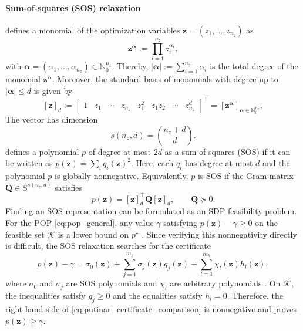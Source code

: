 \paragraph{Sum-of-squares (SOS) relaxation}
\cite{Yang2024Semidefinite} defines a monomial
of the optimization variables \(\bm{z}=(z_1,\ldots,z_{n_z})\) as
\begin{equation}
\bm{z}^{\bm{\alpha}}:=\prod_{i=1}^{n_z}z_i^{\alpha_i},
\label{eq:monomial_basis_comparison}
\end{equation}
with \(\bm{\alpha}=(\alpha_1,\ldots,\alpha_{n_z})\in\mathbb{N}_0^{n_z}\). Thereby, 
$|\bm{\alpha}|:=\sum_{i=1}^{n_z}\alpha_i$ is the total degree of the monomial $\bm{z}^{\bm{\alpha}}$. 
Moreover, the standard basis of monomials with
degree up to \( |\bm{\alpha}|\leq d\) is given by
\[
[\bm{z}]_d:=
\begin{bmatrix}
1 & z_1 & \cdots & z_{n_z} & z_1^2 & z_1z_2 & \cdots & z_{n_z}^d
\end{bmatrix}^{\top}
=
\left[\bm{z}^{\bm{\alpha}}\right]_{\bm{\alpha}\in\mathbb{N}_0^{n_z}},
\]
The vector has dimension
\begin{equation}
s(n_z,d)=\binom{n_z+d}{d}.
\label{eq:monomial_basis_dimension_comparison}
\end{equation}
\cite{Yang2024Semidefinite} defines a polynomial \(p\) of degree at most \(2d\) as a sum of squares (SOS)
if it can be written as
\(p(\bm{z})=\sum_i q_i(\bm{z})^2\). Here, each \(q_i\) has degree at
most \(d\) and the polynomial \(p\) is globally nonnegative. 
Equivalently, \(p\) is SOS if the Gram-matrix $\bm{Q} \in \mathbb{S}^{s(n_z,d)}$ satisfies
\begin{equation}
p(\bm{z})=[\bm{z}]_d^{\top}
\bm{Q}[\bm{z}]_d,
\qquad \bm{Q}\succeq0.
\label{eq:sos_gram_matrix_comparison}
\end{equation}
Finding an SOS representation can be formulated
as an SDP feasibility problem.
For the POP \eqref{eq:pop_general}, any value \(\gamma\)
satisfying \(p(\bm{z})-\gamma\geq0\) on the feasible set \(\mathcal{K}\) is
a lower bound on \(p^\star\) \cite{Yang2024Semidefinite}. 
Since verifying this nonnegativity directly is
difficult, the SOS relaxation searches for the certificate
\begin{equation}
p(\bm{z})-\gamma
=
\sigma_0(\bm{z})
+\sum_{j=1}^{m_g}\sigma_j(\bm{z})g_j(\bm{z})
+\sum_{l=1}^{m_h}\chi_l(\bm{z})h_l(\bm{z}),
\label{eq:putinar_certificate_comparison}
\end{equation}
where \(\sigma_0\) and \(\sigma_j\) are SOS polynomials and \(\chi_l\) are
arbitrary polynomials \cite{Putinar1993Positive}. On
\(\mathcal{K}\), the inequalities satisfy \(g_j\geq0\) and the equalities
satisfy \(h_l=0\). Therefore, the right-hand side of
\eqref{eq:putinar_certificate_comparison} is nonnegative and proves
\(p(\bm{z})\geq\gamma\).

